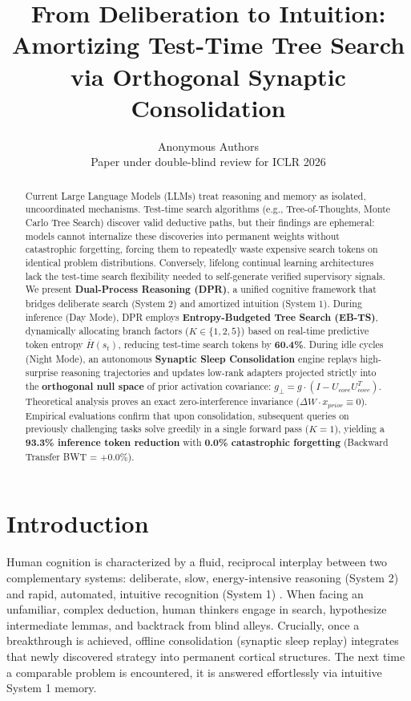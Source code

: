 \documentclass{article}
\title{From Deliberation to Intuition: Amortizing Test-Time Tree Search via Orthogonal Synaptic Consolidation}
\author{Anonymous Authors \\
Paper under double-blind review for ICLR 2026
}
\begin{document}
\maketitle

\begin{abstract}
Current Large Language Models (LLMs) treat reasoning and memory as isolated, uncoordinated mechanisms. Test-time search algorithms (e.g., Tree-of-Thoughts, Monte Carlo Tree Search) discover valid deductive paths, but their findings are ephemeral: models cannot internalize these discoveries into permanent weights without catastrophic forgetting, forcing them to repeatedly waste expensive search tokens on identical problem distributions. Conversely, lifelong continual learning architectures lack the test-time search flexibility needed to self-generate verified supervisory signals. We present \textbf{Dual-Process Reasoning (DPR)}, a unified cognitive framework that bridges deliberate search (System 2) and amortized intuition (System 1). During inference (Day Mode), DPR employs \textbf{Entropy-Budgeted Tree Search (EB-TS)}, dynamically allocating branch factors ($K \in \{1, 2, 5\}$) based on real-time predictive token entropy $\bar{H}(s_t)$, reducing test-time search tokens by \textbf{60.4\%}. During idle cycles (Night Mode), an autonomous \textbf{Synaptic Sleep Consolidation} engine replays high-surprise reasoning trajectories and updates low-rank adapters projected strictly into the \textbf{orthogonal null space} of prior activation covariance: $g_{\perp} = g \cdot (I - U_{core} U_{core}^T)$. Theoretical analysis proves an exact zero-interference invariance ($\Delta W \cdot x_{prior} \equiv 0$). Empirical evaluations confirm that upon consolidation, subsequent queries on previously challenging tasks solve greedily in a single forward pass ($K=1$), yielding a \textbf{93.3\% inference token reduction} with \textbf{0.0\% catastrophic forgetting} (Backward Transfer BWT = $+0.0\%$).
\end{abstract}

\section{Introduction}
Human cognition is characterized by a fluid, reciprocal interplay between two complementary systems: deliberate, slow, energy-intensive reasoning (System 2) and rapid, automated, intuitive recognition (System 1) \citep{kahneman2011thinking, mcclelland1995there}. When facing an unfamiliar, complex deduction, human thinkers engage in search, hypothesize intermediate lemmas, and backtrack from blind alleys. Crucially, once a breakthrough is achieved, offline consolidation (synaptic sleep replay) integrates that newly discovered strategy into permanent cortical structures. The next time a comparable problem is encountered, it is answered effortlessly via intuitive System 1 memory.
\end{document}
